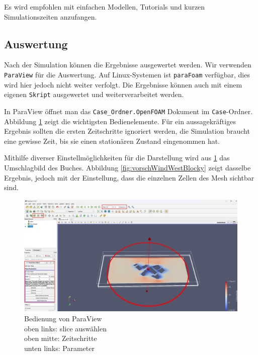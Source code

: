 Es wird empfohlen mit einfachen Modellen, Tutorials und kurzen Simulationszeiten anzufangen.

\subsection{Auswertung \label{openfoam:section:Auswertung}}
Nach der Simulation können die Ergebnisse ausgewertet werden. 
Wir verwenden \texttt{ParaView} für die Auswertung. 
Auf Linux-Systemen ist \texttt{paraFoam} verfügbar, dies wird hier jedoch nicht weiter verfolgt.
Die Ergebnisse können auch mit einem eigenen \texttt{Skript} ausgewertet und weiterverarbeitet werden.

In ParaView öffnet man das \texttt{Case\_Ordner.OpenFOAM} Dokument im \texttt{Case}-Ordner.
Abbildung \ref{fig:Beispiel_Paraview} zeigt die wichtigsten Bedienelemente.
Für ein aussagekräftiges Ergebnis sollten die ersten Zeitschritte ignoriert werden, die Simulation braucht eine gewisse Zeit, bis sie einen stationären Zustand eingenommen hat.

Mithilfe diverser Einstellmöglichkeiten für die Darstellung wird aus \ref{fig:Beispiel_Paraview} das Umschlagbild des Buches.
Abbildung \ref{fig:vorschWindWestBlocky} zeigt dasselbe Ergebnis, jedoch mit der Einstellung, dass die einzelnen Zellen des Mesh sichtbar sind.

\begin{figure}
    \centering
    \includegraphics[width=1\textwidth]{papers/openfoam/Bilder/Beispiel_Paraview.png}
    \caption{Bedienung von ParaView\\ oben links: slice auswählen\\ oben mitte: Zeitschritte\\ unten links: Parameter}
    \label{fig:Beispiel_Paraview}
\end{figure}

